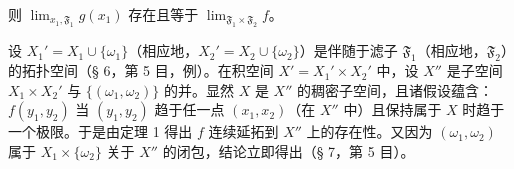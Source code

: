 则 \(\lim_{x_1, \mathfrak{F}_1} g(x_1)\) 存在且等于 \(\lim_{\mathfrak{F}_1 \times \mathfrak{F}_2} f\)。

设 \(X_1' = X_1 \cup \{ \omega_1 \}\)（相应地，\(X_2' = X_2 \cup \{ \omega_2 \}\)）是伴随于滤子 \(\mathfrak{F}_1\)（相应地，\(\mathfrak{F}_2\)）的拓扑空间（§ 6，第 5 目，例）。在积空间 \(X' = X_1' \times X_2'\) 中，设 \(X''\) 是子空间 \(X_1 \times X_2'\) 与 \(\{ (\omega_1, \omega_2) \}\) 的并。显然 \(X\) 是 \(X''\) 的稠密子空间，且诸假设蕴含：\(f(y_1, y_2)\) 当 \((y_1, y_2)\) 趋于任一点 \((x_1, x_2)\)（在 \(X''\) 中）且保持属于 \(X\) 时趋于一个极限。于是由定理 1 得出 \(f\) 连续延拓到 \(X''\) 上的存在性。又因为 \((\omega_1, \omega_2)\) 属于 \(X_1 \times \{ \omega_2 \}\) 关于 \(X''\) 的闭包，结论立即得出（§ 7，第 5 目）。

